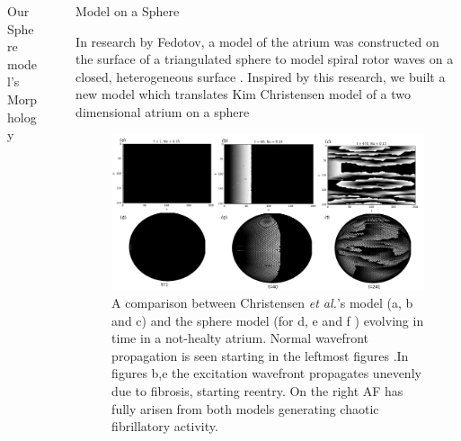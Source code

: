 \documentclass[final,hyperref={pdfpagelabels=false}]{beamer}
\begin{document}
\begin{frame}[t]
\begin{columns}[t]
\begin{column}{.465\textwidth}
\begin{block}{Our Sphere model's Morphology}
\end{block}




\end{column} %

\begin{column}{.03\textwidth}\end{column} %
 
\begin{column}{.465\textwidth} %









\begin{block}{Model on a Sphere}




In research by Fedotov, a model of the atrium was constructed on the surface of a triangulated sphere to model spiral rotor waves on a closed, heterogeneous surface \cite{Fedotov}. Inspired by this research, we built a new model which translates Kim Christensen model of a two dimensional atrium on a sphere



\begin{figure}
\includegraphics[width=0.8\linewidth]{combchristensenspherefib}
\caption{A comparison between Christensen \emph{et al.}'s model  (a, b and c)  and the sphere model (for d, e and f ) evolving in time in a not-healty atrium. Normal wavefront propagation is seen starting in the leftmost figures .In figures b,e the excitation wavefront propagates unevenly due to fibrosis, starting reentry. On the right AF has fully arisen from both models generating chaotic fibrillatory activity.}
\end{figure}


\end{block}
\end{column}
\end{columns}
\end{frame}
\end{document}
